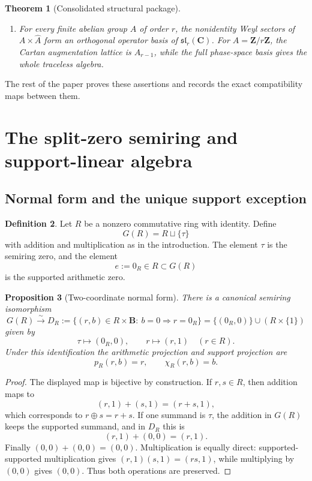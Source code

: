 \documentclass[11pt]{article}
\newcommand{\C}{\mathbf C}
\newcommand{\Z}{\mathbf Z}
\newcommand{\B}{\mathbf B}
\newcommand{\End}{\operatorname{End}}
\theoremstyle{plain}
\newtheorem{theorem}{Theorem}[section]
\newtheorem{proposition}[theorem]{Proposition}
\theoremstyle{definition}
\newtheorem{definition}[theorem]{Definition}
\begin{document}
\begin{theorem}[Consolidated structural package]
\begin{enumerate}[label=\textup{(\arabic*)}]
\[
   \mathfrak B_{\mu,\nu}
   =\End(\C^s)\oplus J_\mu\oplus J_\nu^\vee,
   \qquad
   \dim J_\mu=|\mu|,
   \quad
   \dim J_\nu=|\nu|.
\]
For \(\mu=\nu=(1^s)\), this space is canonically
\[
   \mathfrak{sl}_{s+1}(\C)
\]
as a vector space, with the Lie bracket induced by block matrices.
\item For every finite abelian group \(A\) of order \(r\), the nonidentity Weyl sectors of \(A\times\widehat A\) form an orthogonal operator basis of \(\mathfrak{sl}_r(\C)\).  For \(A=\Z/r\Z\), the Cartan augmentation lattice is \(A_{r-1}\), while the full phase-space basis gives the whole traceless algebra.
\end{enumerate}
\end{theorem}

The rest of the paper proves these assertions and records the exact compatibility maps between them.

\section{The split-zero semiring and support-linear algebra}

\subsection{Normal form and the unique support exception}

\begin{definition}\label{def:G-R}
Let \(R\) be a nonzero commutative ring with identity.  Define
\[
   G(R)=R\sqcup\{\tau\}
\]
with addition and multiplication as in the introduction.  The element \(\tau\) is the semiring zero, and the element
\[
   e:=0_R\in R\subset G(R)
\]
is the supported arithmetic zero.
\end{definition}

\begin{proposition}[Two-coordinate normal form]\label{prop:normal-form}
There is a canonical semiring isomorphism
\[
   G(R)\xrightarrow{\sim}
   D_R:=\{(r,b)\in R\times\B:\ b=0\Rightarrow r=0_R\}
   =\{(0_R,0)\}\cup(R\times\{1\})
\]
given by
\[
   \tau\mapsto (0_R,0),
   \qquad
   r\mapsto (r,1)\quad(r\in R).
\]
Under this identification the arithmetic projection and support projection are
\[
   p_R(r,b)=r,
   \qquad
   \chi_R(r,b)=b.
\]
\end{proposition}

\begin{proof}
The displayed map is bijective by construction.  If \(r,s\in R\), then addition maps to
\[
  (r,1)+(s,1)=(r+s,1),
\]
which corresponds to \(r\oplus s=r+s\).  If one summand is \(\tau\), the addition in \(G(R)\) keeps the supported summand, and in \(D_R\) this is
\[
   (r,1)+(0,0)=(r,1).
\]
Finally \((0,0)+(0,0)=(0,0)\).  Multiplication is equally direct: supported-supported multiplication gives
\((r,1)(s,1)=(rs,1)\), while multiplying by \((0,0)\) gives \((0,0)\).  Thus both operations are preserved.
\end{proof}
\end{document}
